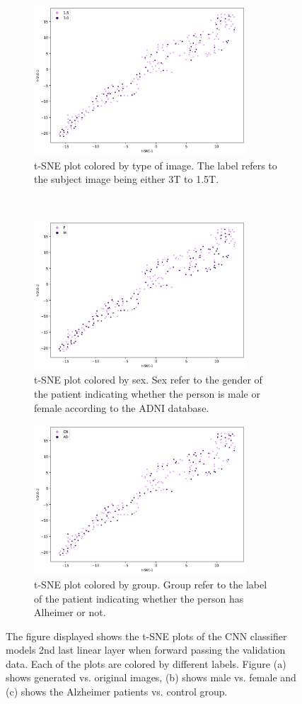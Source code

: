 \documentclass[12pt, fleqn, titlepage]{article}
\newcommand{\1}[1]{\mathds{1}\left[#1\right]}
\begin{document}
\begin{figure}[H]
	\centering
	\begin{subfigure}[t]{0.59\textwidth}
		\centering
		\includegraphics[height=2.2in]{imgs/classifier/not_generated_imgs_tsne_type}%
		\caption{t-SNE plot colored by type of image. The label refers to the subject image being either 3T to 1.5T.}
	\end{subfigure}%
	~
	\begin{subfigure}[t]{0.5\textwidth}
		\centering
		\includegraphics[height=2.2in]{imgs/classifier/not_generated_imgs_tsne_sex}%
		\caption{t-SNE plot colored by sex. Sex refer to the gender of the patient indicating whether the person is male or female according to the ADNI database.}	
	\end{subfigure}
	\begin{subfigure}[t]{0.5\textwidth}
		\centering
		\includegraphics[height=2.2in]{imgs/classifier/not_generated_imgs_tsne_group}%
		\caption{t-SNE plot colored by group. Group refer to the label of the patient indicating whether the person has Alheimer or not.}
	\end{subfigure}

	\caption{The figure displayed shows the t-SNE plots of the CNN classifier models 2nd last linear layer when forward passing the validation data. Each of the plots are colored by different labels. Figure (a) shows generated vs. original images, (b) shows male vs. female and (c) shows the Alzheimer patients vs. control group. }
		\label{fig:tsne_not_gen}
\end{figure}
\end{document}
